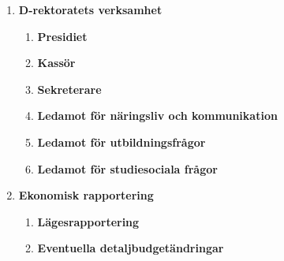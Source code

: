 \documentclass{protokoll}
\begin{document}
  \begin{enumerate}
    \item \textbf{D-rektoratets verksamhet}
	\begin{enumerate}
        \item \textbf{Presidiet}\\
        \item \textbf{Kassör}\\
        \item \textbf{Sekreterare}\\
        \item \textbf{Ledamot för näringsliv och kommunikation}
        \item \textbf{Ledamot för utbildningsfrågor}
        \item \textbf{Ledamot för studiesociala frågor}
	\end{enumerate}
    \item \textbf{Ekonomisk rapportering}
	\begin{enumerate}
        \item \textbf{Lägesrapportering}\\
        \item \textbf{Eventuella detaljbudgetändringar}\\
	\end{enumerate}
  \end{enumerate}






\end{document}
